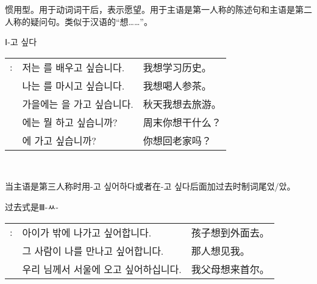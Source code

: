 \begin{grammar}
\begin{grammarsect}[\kr -고 싶다]
\begin{itemize}
            \item 惯用型。用于动词词干后，表示愿望。用于主语是第一人称的陈述句和主语是第二人称的疑问句。类似于汉语的“想……”。
            {\color{gray} \item Ⅰ{\kr -고 싶다} }
        \end{itemize}
        \begin{tabular}{lll}
            \kr \ruby{例}{예}: &\kr 저는 \ruby{歷史}{역사}를 배우고 싶습니다.&我想学习历史。\\
            &\kr 나는 \ruby{人蔘茶}{인삼차}를 마시고 싶습니다.&我想喝人参茶。\\
            &\kr 가을에는 \ruby{旅行}{여행}을 가고 싶습니다.&秋天我想去旅游。\\
            &\kr \ruby{週末}{주말}에는 뭘 하고 싶습니까?&周末你想干什么？\\
            &\kr \ruby{故鄉}{고향}에 가고 싶습니까?&你想回老家吗？
        \end{tabular}\\
        \begin{itemize}
            \item 当主语是第三人称时用{\kr -고 싶어하다}或者在{\kr -고 싶다}后面加过去时制词尾{\kr 었/았}。
            {\color{gray} \item 过去式是Ⅲ-ㅆ-} 
        \end{itemize}
        \begin{tabular}{lll}
            \kr \ruby{例}{예}: &\kr 아이가 밖에 나가고 싶어합니다. &孩子想到外面去。\\
            &\kr 그 사람이 나를 만나고 싶어합니다. &那人想见我。\\
            &\kr 우리 \ruby{父母}{부모}님께서 서울에 오고 싶어하십니다.&我父母想来首尔。
        \end{tabular}\\
    \end{grammarsect}
\end{grammar}
